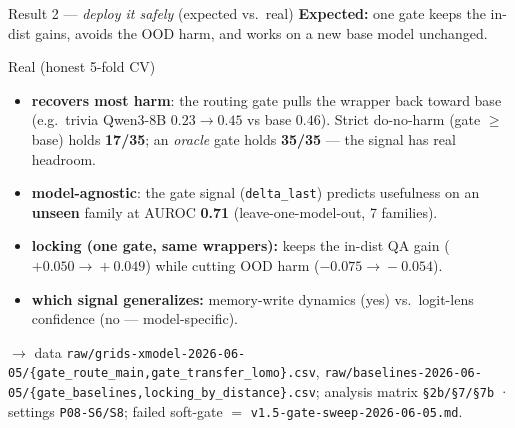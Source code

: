 \begin{frame}{Result 2 --- \emph{deploy it safely} (expected vs.\ real)}
  \small
  \textbf{Expected:} one gate keeps the in-dist gains, avoids the OOD harm, and works on a new base model unchanged.
  \vspace{0.4em}
  \begin{block}{Real (honest 5-fold CV)}
  \begin{itemize}
    \item \textbf{recovers most harm}: the routing gate pulls the wrapper back toward base (e.g.\ trivia Qwen3-8B $0.23\to0.45$ vs base $0.46$). Strict do-no-harm (gate $\ge$ base) holds \textbf{17/35}; an \emph{oracle} gate holds \textbf{35/35} --- the signal has real headroom.
    \item \textbf{model-agnostic}: the gate signal (\texttt{delta\_last}) predicts usefulness on an \textbf{unseen} family at AUROC \textbf{0.71} (leave-one-model-out, 7 families).
    \item \textbf{locking (one gate, same wrappers):} keeps the in-dist QA gain ($+0.050\!\to\!+0.049$) while cutting OOD harm ($-0.075\!\to\!-0.054$).
    \item \textbf{which signal generalizes:} memory-write dynamics (yes) vs.\ logit-lens confidence (no --- model-specific).
  \end{itemize}
  \end{block}
  \footnotesize $\rightarrow$ data \texttt{raw/grids-xmodel-2026-06-05/\{gate\_route\_main,gate\_transfer\_lomo\}.csv}, \texttt{raw/baselines-2026-06-05/\{gate\_baselines,locking\_by\_distance\}.csv}; analysis matrix \texttt{\S2b/\S7/\S7b} · settings \texttt{P08-S6/S8}; failed soft-gate $=$ \texttt{v1.5-gate-sweep-2026-06-05.md}.
\end{frame}
